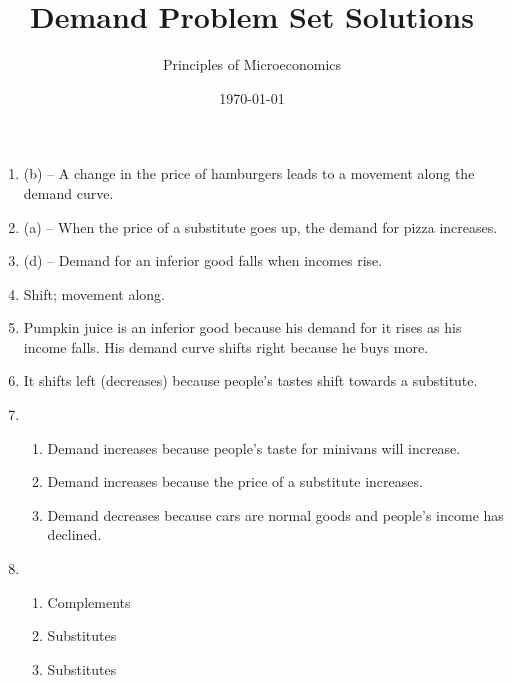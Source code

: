 \documentclass{article}
\title{Demand Problem Set Solutions}
\author{Principles of Microeconomics}
\date{\today}
\begin{document}
\maketitle

\begin{enumerate}

\item (b) -- A change in the price of hamburgers leads to a movement along the demand curve.

\item (a) -- When the price of a substitute goes up, the demand for pizza increases.

\item (d) -- Demand for an inferior good falls when incomes rise.

\item Shift; movement along.

\item Pumpkin juice is an inferior good because his demand for it rises as his income falls. His demand curve shifts right because he buys more. 

\item It shifts left (decreases) because people's tastes shift towards a substitute.

\item 

	\begin{enumerate}
	
	\item Demand increases because people's taste for minivans will increase.
	
	\item Demand increases because the price of a substitute increases.
	
	\item Demand decreases because cars are normal goods and people's income has declined. 
	
	\end{enumerate}
	
\item

	\begin{enumerate}
	
	\item Complements
	
	\item Substitutes
	
	\item Substitutes
	
	\end{enumerate}

\end{enumerate}
\end{document}
